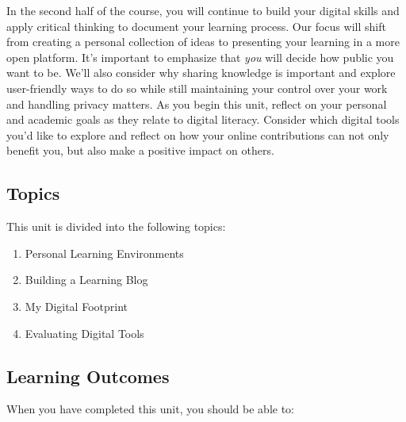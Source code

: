 \documentclass[
]{book}
\providecommand{\tightlist}{%
  \setlength{\itemsep}{0pt}\setlength{\parskip}{0pt}}
\theoremstyle{definition}
\theoremstyle{definition}
\theoremstyle{definition}
\theoremstyle{definition}
\theoremstyle{remark}
\begin{document}
In the second half of the course, you will continue to build your digital skills and apply critical thinking to document your learning process. Our focus will shift from creating a personal collection of ideas to presenting your learning in a more open platform. It's important to emphasize that \emph{you} will decide how public you want to be. We'll also consider why sharing knowledge is important and explore user-friendly ways to do so while still maintaining your control over your work and handling privacy matters. As you begin this unit, reflect on your personal and academic goals as they relate to digital literacy. Consider which digital tools you'd like to explore and reflect on how your online contributions can not only benefit you, but also make a positive impact on others.

\hypertarget{topics-3}{%
\subsection*{Topics}\label{topics-3}}

This unit is divided into the following topics:

\begin{enumerate}
\def\labelenumi{\arabic{enumi}.}
\tightlist
\item
  Personal Learning Environments\\
\item
  Building a Learning Blog\\
\item
  My Digital Footprint\\
\item
  Evaluating Digital Tools
\end{enumerate}

\hypertarget{learning-outcomes-3}{%
\subsection*{Learning Outcomes}\label{learning-outcomes-3}}

When you have completed this unit, you should be able to:
\end{document}
